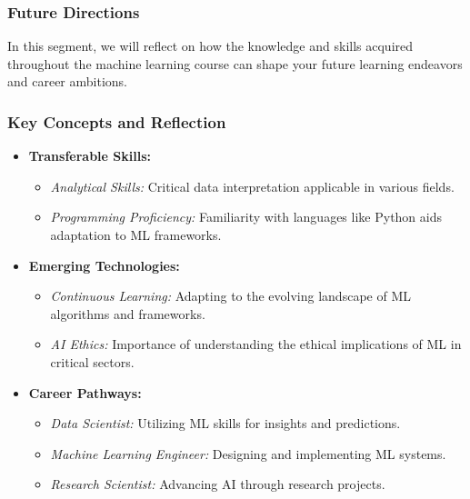\documentclass[aspectratio=169]{beamer}
\begin{document}
\begin{frame}[fragile]
    \frametitle{Future Directions}
    In this segment, we will reflect on how the knowledge and skills acquired throughout the machine learning course can shape your future learning endeavors and career ambitions.
\end{frame}

\begin{frame}[fragile]
    \frametitle{Key Concepts and Reflection}

    \begin{itemize}
        \item \textbf{Transferable Skills:}
        \begin{itemize}
            \item \textit{Analytical Skills:} Critical data interpretation applicable in various fields.
            \item \textit{Programming Proficiency:} Familiarity with languages like Python aids adaptation to ML frameworks.
        \end{itemize}
        
        \item \textbf{Emerging Technologies:}
        \begin{itemize}
            \item \textit{Continuous Learning:} Adapting to the evolving landscape of ML algorithms and frameworks.
            \item \textit{AI Ethics:} Importance of understanding the ethical implications of ML in critical sectors.
        \end{itemize}
        
        \item \textbf{Career Pathways:}
        \begin{itemize}
            \item \textit{Data Scientist:} Utilizing ML skills for insights and predictions.
            \item \textit{Machine Learning Engineer:} Designing and implementing ML systems.
            \item \textit{Research Scientist:} Advancing AI through research projects.
        \end{itemize}
    \end{itemize}
\end{frame}
\end{document}
